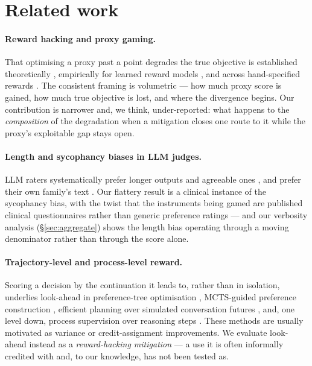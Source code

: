 \section{Related work}
\label{sec:related}

\paragraph{Reward hacking and proxy gaming.} That optimising a proxy past a point degrades the
true objective is established theoretically \citep{skalse2022defining}, empirically for learned
reward models \citep{gao2023scaling}, and across hand-specified rewards
\citep{amodei2016concrete,pan2022effects}. The consistent framing is volumetric --- how much
proxy score is gained, how much true objective is lost, and where the divergence begins. Our
contribution is narrower and, we think, under-reported: what happens to the \emph{composition}
of the degradation when a mitigation closes one route to it while the proxy's exploitable gap
stays open.

\paragraph{Length and sycophancy biases in LLM judges.} LLM raters systematically prefer longer
outputs \citep{singhal2024long,dubois2024lengthcontrolled,zheng2023judging} and agreeable ones
\citep{sharma2024sycophancy}, and prefer their own family's text \citep{panickssery2024selfpreference}.
Our flattery result is a clinical instance of the sycophancy bias, with the twist that the
instruments being gamed are published clinical questionnaires rather than generic preference
ratings --- and our verbosity analysis (\S\ref{sec:aggregate}) shows the length bias operating
through a moving denominator rather than through the score alone.

\paragraph{Trajectory-level and process-level reward.} Scoring a decision by the continuation it
leads to, rather than in isolation, underlies look-ahead in preference-tree optimisation
\citep{baruch2025pto}, MCTS-guided preference construction \citep{xie2024mctsdpo,yu2023promptmcts},
efficient planning over simulated conversation futures \citep{chen2025broaden}, and, one level
down, process supervision over reasoning steps \citep{lightman2024letsverify}. These methods are
usually motivated as variance or credit-assignment improvements. We evaluate look-ahead instead
as a \emph{reward-hacking mitigation} --- a use it is often informally credited with and, to our
knowledge, has not been tested as.

